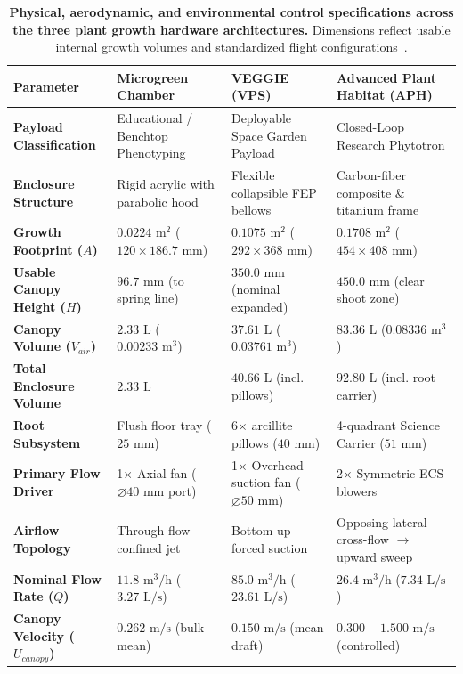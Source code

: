 \begin{table}[t]
\centering
\small
\caption{\textbf{Physical, aerodynamic, and environmental control specifications across the three plant growth hardware architectures.} Dimensions reflect usable internal growth volumes and standardized flight configurations~\cite{massa2017, morrow2016}.}
\label{tab:hardware_specs}
\begin{tabularx}{\textwidth}{lXXX}
\toprule
\textbf{Parameter} & \textbf{Microgreen Chamber} & \textbf{VEGGIE (VPS)} & \textbf{Advanced Plant Habitat (APH)} \\
\midrule
\textbf{Payload Classification} & Educational / Benchtop Phenotyping & Deployable Space Garden Payload & Closed-Loop Research Phytotron \\
\textbf{Enclosure Structure} & Rigid acrylic with parabolic hood & Flexible collapsible FEP bellows & Carbon-fiber composite \& titanium frame \\
\textbf{Growth Footprint ($A$)} & $0.0224\text{ m}^2$ ($120 \times 186.7\text{ mm}$) & $0.1075\text{ m}^2$ ($292 \times 368\text{ mm}$) & $0.1708\text{ m}^2$ ($454 \times 408\text{ mm}$) \\
\textbf{Usable Canopy Height ($H$)} & $96.7\text{ mm}$ (to spring line) & $350.0\text{ mm}$ (nominal expanded) & $450.0\text{ mm}$ (clear shoot zone) \\
\textbf{Canopy Volume ($V_{air}$)} & $2.33\text{ L}$ ($0.00233\text{ m}^3$) & $37.61\text{ L}$ ($0.03761\text{ m}^3$) & $83.36\text{ L}$ ($0.08336\text{ m}^3$) \\
\textbf{Total Enclosure Volume} & $2.33\text{ L}$ & $40.66\text{ L}$ (incl. pillows) & $92.80\text{ L}$ (incl. root carrier) \\
\textbf{Root Subsystem} & Flush floor tray ($25\text{ mm}$) & 6$\times$ arcillite pillows ($40\text{ mm}$) & 4-quadrant Science Carrier ($51\text{ mm}$) \\
\textbf{Primary Flow Driver} & 1$\times$ Axial fan ($\varnothing40\text{ mm}$ port) & 1$\times$ Overhead suction fan ($\varnothing50\text{ mm}$) & 2$\times$ Symmetric ECS blowers \\
\textbf{Airflow Topology} & Through-flow confined jet & Bottom-up forced suction & Opposing lateral cross-flow $\to$ upward sweep \\
\textbf{Nominal Flow Rate ($Q$)} & $11.8\text{ m}^3/\text{h}$ ($3.27\text{ L/s}$) & $85.0\text{ m}^3/\text{h}$ ($23.61\text{ L/s}$) & $26.4\text{ m}^3/\text{h}$ ($7.34\text{ L/s}$) \\
\textbf{Canopy Velocity ($U_{canopy}$)} & $0.262\text{ m/s}$ (bulk mean) & $0.150\text{ m/s}$ (mean draft) & $0.300 - 1.500\text{ m/s}$ (controlled) \\

\end{tabularx}
\end{table}
